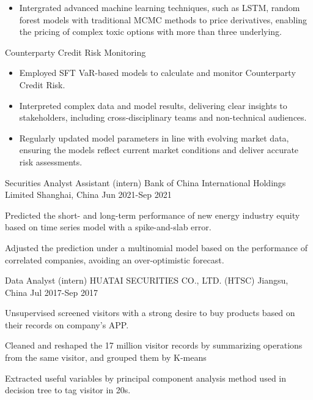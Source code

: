 \begin{cventries}
{\begin{cvitems}
\begin{itemize}
          \item Intergrated advanced machine learning techniques, such as LSTM, random forest models with traditional MCMC methods to price derivatives, enabling the pricing of complex toxic options with more than three underlying.
        \end{itemize}
        \item Counterparty Credit Risk Monitoring
        \begin{itemize}
          \item Employed SFT VaR-based models to calculate and monitor Counterparty Credit Risk.
          \item Interpreted complex data and model results, delivering clear insights to stakeholders, including cross-disciplinary teams and non-technical audiences.
          \item Regularly updated model parameters in line with evolving market data, ensuring the models reflect current market conditions and deliver accurate risk assessments.
        \end{itemize}
      \end{cvitems}
    }


  \cventry
    {Securities Analyst Assistant (intern)} %
    {Bank of China International Holdings Limited} %
    {Shanghai, China} %
    {Jun 2021-Sep 2021} %
    {
      \begin{cvitems} %
        \item {Predicted the short- and long-term performance of new energy industry equity based on time series model with a spike-and-slab error.}
        \item {Adjusted the prediction under a multinomial model based on the performance of correlated companies, avoiding an over-optimistic forecast.}
      \end{cvitems}
    }

  \cventry
    {Data Analyst (intern)} %
    {HUATAI SECURITIES CO., LTD. (HTSC)} %
    {Jiangsu, China} %
    {Jul 2017-Sep 2017} %
    {
      \begin{cvitems} %
        \item {Unsupervised screened visitors with a strong desire to buy products based on their records on company’s APP.}
        \item {Cleaned and reshaped the 17 million visitor records by summarizing operations from the same visitor, and grouped them by K-means }
        \item {Extracted useful variables by principal component analysis method used in decision tree to tag visitor in 20s.}
      \end{cvitems}
    }



\end{cventries}
